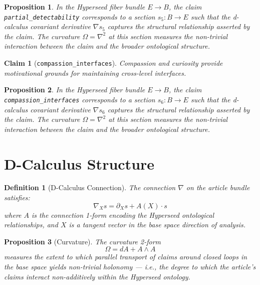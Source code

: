 \documentclass{article}
\newtheorem{claim}{Claim}
\newtheorem{definition}{Definition}
\newtheorem{proposition}{Proposition}
\begin{document}
\begin{proposition}
In the Hyperseed fiber bundle $E \to B$, the claim \texttt{partial_detectability} corresponds to a section $s_5: B \to E$ such that the d-calculus covariant derivative $\nabla s_5$ captures the structural relationship asserted by the claim. The curvature $\Omega = \nabla^2$ at this section measures the non-trivial interaction between the claim and the broader ontological structure.
\end{proposition}

\begin{claim}[\texttt{compassion_interfaces}]
Compassion and curiosity provide motivational grounds for maintaining cross-level interfaces.
\end{claim}

\begin{proposition}
In the Hyperseed fiber bundle $E \to B$, the claim \texttt{compassion_interfaces} corresponds to a section $s_6: B \to E$ such that the d-calculus covariant derivative $\nabla s_6$ captures the structural relationship asserted by the claim. The curvature $\Omega = \nabla^2$ at this section measures the non-trivial interaction between the claim and the broader ontological structure.
\end{proposition}

\section{D-Calculus Structure}

\begin{definition}[D-Calculus Connection]
The connection $\nabla$ on the article bundle satisfies:
\begin{equation}
  \nabla_X s = \partial_X s + A(X) \cdot s
\end{equation}
where $A$ is the connection 1-form encoding the Hyperseed ontological relationships, and $X$ is a tangent vector in the base space direction of analysis.
\end{definition}

\begin{proposition}[Curvature]
The curvature 2-form
\begin{equation}
  \Omega = dA + A \wedge A
\end{equation}
measures the extent to which parallel transport of claims around closed loops in the base space yields non-trivial holonomy --- i.e., the degree to which the article's claims interact non-additively within the Hyperseed ontology.
\end{proposition}
\end{document}
